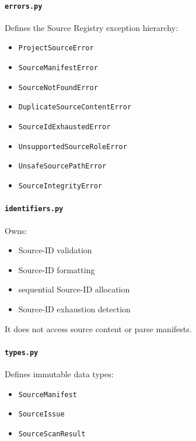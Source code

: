 \hypertarget{errorspy-1}{%
\paragraph{\texorpdfstring{\texttt{errors.py}}{errors.py}}\label{errorspy-1}}

Defines the Source Registry exception hierarchy:

\begin{itemize}
\tightlist
\item
  \texttt{ProjectSourceError}
\item
  \texttt{SourceManifestError}
\item
  \texttt{SourceNotFoundError}
\item
  \texttt{DuplicateSourceContentError}
\item
  \texttt{SourceIdExhaustedError}
\item
  \texttt{UnsupportedSourceRoleError}
\item
  \texttt{UnsafeSourcePathError}
\item
  \texttt{SourceIntegrityError}
\end{itemize}

\hypertarget{identifierspy-1}{%
\paragraph{\texorpdfstring{\texttt{identifiers.py}}{identifiers.py}}\label{identifierspy-1}}

Owns:

\begin{itemize}
\tightlist
\item
  Source-ID validation
\item
  Source-ID formatting
\item
  sequential Source-ID allocation
\item
  Source-ID exhaustion detection
\end{itemize}

It does not access source content or parse manifests.

\hypertarget{typespy-1}{%
\paragraph{\texorpdfstring{\texttt{types.py}}{types.py}}\label{typespy-1}}

Defines immutable data types:

\begin{itemize}
\tightlist
\item
  \texttt{SourceManifest}
\item
  \texttt{SourceIssue}
\item
  \texttt{SourceScanResult}
\end{itemize}

